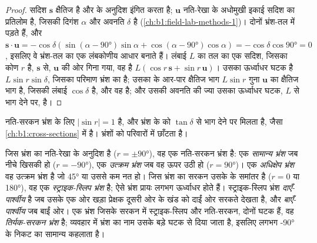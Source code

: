 \begin{proof}
सदिश $\mathbf s$ क्षैतिज है और  के अनुदिश इंगित करता है; $\mathbf u$
नति-रेखा के अधोमुखी इकाई सदिश का प्रतिलोम है, जिसकी दिगंश $\alpha$ और अवनति $\delta$ है
(\cref{ch:b1:field-lab-methods-1})। दोनों भ्रंश-तल में पड़ते हैं, और $\mathbf s\cdot\mathbf u = -\cos\delta(\sin(\alpha -
\ang{90})\sin\alpha + \cos(\alpha - \ang{90})\cos\alpha) = -\cos\delta\cos\ang{90} = 0$,
इसलिए वे भ्रंश-तल का एक लंबकोणीय आधार बनाते हैं। लंबाई $L$ का तल का एक सदिश, जिसका कोण $r$ है, $\mathbf s$ से, $\mathbf u$ की ओर गिना गया, वह है
$L(\cos r\,\mathbf s + \sin r\,\mathbf u)$। उसका ऊर्ध्वाधर घटक है
$L\sin r\sin\delta$, जिसका परिमाण भ्रंश का  है; उसका  के आर-पार क्षैतिज भाग $L\sin r$ गुना $\mathbf u$ का क्षैतिज भाग है, जिसकी लंबाई $\cos\delta$ है, और वह  है; और उसकी अवनति की ज्या उसका ऊर्ध्वाधर घटक, $L$ से भाग देने पर, है।
\end{proof}

नति-सरकन भ्रंश के लिए $|\sin r| = 1$ है, और  भ्रंश के  को $\tan\delta$ से भाग देने पर मिलता है, जैसा \cref{ch:b1:cross-sections} में है।  भ्रंशों को परिवारों में छाँटता है।

\begin{definition}[सामान्य, उत्क्रम, अधिक्षेप, स्ट्राइक-स्लिप और तिर्यक-सरकन भ्रंश]
\label{def:b1:faults-folds-fabrics:fault-types}
जिस भ्रंश का  नति-रेखा के अनुदिश है ($r = \pm\ang{90}$), वह एक नति-सरकन भ्रंश है: एक \emph{सामान्य भ्रंश} जब  नीचे खिसकी हो ($r = \ang{-90}$), एक \emph{उत्क्रम भ्रंश} जब वह ऊपर उठी हो ($r = \ang{90}$)। एक \emph{अधिक्षेप भ्रंश} वह उत्क्रम भ्रंश है जो \ang{45} या उससे कम नत हो। जिस भ्रंश का सरकन उसके  के समांतर है ($r = 0$ या \ang{180}), वह एक \emph{स्ट्राइक-स्लिप भ्रंश} है; ऐसे भ्रंश प्रायः लगभग ऊर्ध्वाधर होते हैं। स्ट्राइक-स्लिप भ्रंश \emph{दाएँ-पार्श्वीय} है जब उसके एक ओर खड़ा प्रेक्षक दूसरी ओर के खंड को दाईं ओर सरकते देखता है, और \emph{बाएँ-पार्श्वीय} जब बाईं ओर। एक भ्रंश जिसके सरकन में स्ट्राइक-स्लिप और नति-सरकन, दोनों घटक हैं, वह \emph{तिर्यक-सरकन भ्रंश} है; व्यवहार में भ्रंश का नाम उसके बड़े घटक से दिया जाता है, इसलिए लगभग \ang{-90} के निकट का  सामान्य कहलाता है।
\end{definition}

